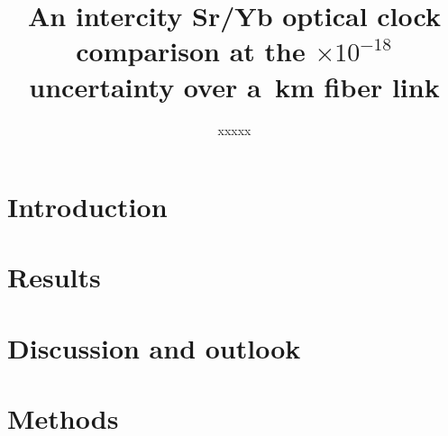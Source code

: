 \documentclass[11pt,a4paper]{article}
\title{An intercity Sr/Yb optical clock comparison at the
\uTotalShort$\times10^{-18}$ uncertainty over a \fibreKm\,km fiber link}
\author{%
  xxxxx%
}
\date{}
\begin{document}
\maketitle

\begin{abstract}
\sloppy

\end{abstract}

\section{Introduction}
\label{sec:intro}


\section{Results}
\label{sec:results}


\section{Discussion and outlook}
\label{sec:discussion}





\section*{Methods}

\end{document}

